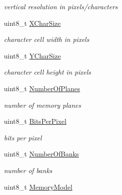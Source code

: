 \begin{DoxyCompactItemize}
\begin{DoxyCompactList}\small\item\em vertical resolution in pixels/characters \end{DoxyCompactList}\item 
\hypertarget{group__vbe_ga047d8f41434f02589d0c9b90b17c67eb}{}uint8\+\_\+t \hyperlink{group__vbe_ga047d8f41434f02589d0c9b90b17c67eb}{X\+Char\+Size}\label{group__vbe_ga047d8f41434f02589d0c9b90b17c67eb}

\begin{DoxyCompactList}\small\item\em character cell width in pixels \end{DoxyCompactList}\item 
\hypertarget{group__vbe_ga330f00ebd49dccd2325d43cdbd646f09}{}uint8\+\_\+t \hyperlink{group__vbe_ga330f00ebd49dccd2325d43cdbd646f09}{Y\+Char\+Size}\label{group__vbe_ga330f00ebd49dccd2325d43cdbd646f09}

\begin{DoxyCompactList}\small\item\em character cell height in pixels \end{DoxyCompactList}\item 
\hypertarget{group__vbe_ga51268efaac55d78e17263aff9a447998}{}uint8\+\_\+t \hyperlink{group__vbe_ga51268efaac55d78e17263aff9a447998}{Number\+Of\+Planes}\label{group__vbe_ga51268efaac55d78e17263aff9a447998}

\begin{DoxyCompactList}\small\item\em number of memory planes \end{DoxyCompactList}\item 
\hypertarget{group__vbe_ga03756ae144fce823087a2a4255bf4bb1}{}uint8\+\_\+t \hyperlink{group__vbe_ga03756ae144fce823087a2a4255bf4bb1}{Bits\+Per\+Pixel}\label{group__vbe_ga03756ae144fce823087a2a4255bf4bb1}

\begin{DoxyCompactList}\small\item\em bits per pixel \end{DoxyCompactList}\item 
\hypertarget{group__vbe_gaa955c03441b6d3e55b2ba4be4dae56a2}{}uint8\+\_\+t \hyperlink{group__vbe_gaa955c03441b6d3e55b2ba4be4dae56a2}{Number\+Of\+Banks}\label{group__vbe_gaa955c03441b6d3e55b2ba4be4dae56a2}

\begin{DoxyCompactList}\small\item\em number of banks \end{DoxyCompactList}\item 
\hypertarget{group__vbe_gab9be703b2b515ba3428ed97af9bb084d}{}uint8\+\_\+t \hyperlink{group__vbe_gab9be703b2b515ba3428ed97af9bb084d}{Memory\+Model}\label{group__vbe_gab9be703b2b515ba3428ed97af9bb084d}


\end{DoxyCompactItemize}
